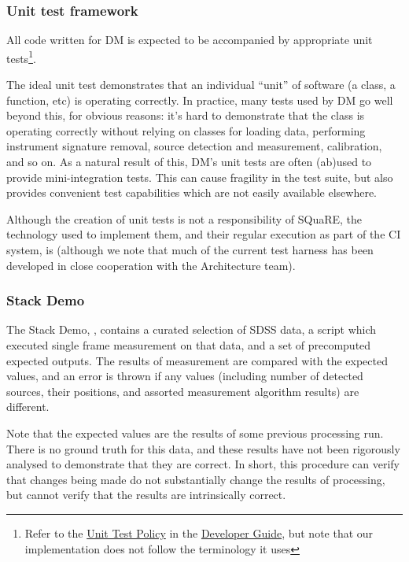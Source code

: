 \documentclass[DM,authoryear,toc,lsstdraft]{lsstdoc}
\begin{document}
\subsubsection{Unit test framework}

All code written for DM is expected to be accompanied by appropriate unit
tests\footnote{Refer to the
\href{https://developer.lsst.io/coding/unit_test_policy.html}{Unit Test
Policy} in the \href{https://developer.lsst.io}{Developer Guide}, but note
that our implementation does not follow the terminology it uses}.

The ideal unit test demonstrates that an individual ``unit'' of software (a
class, a function, etc) is operating correctly. In practice, many tests used
by DM go well beyond this, for obvious reasons: it's hard to demonstrate that
the  class is operating correctly without relying on
classes for loading data, performing instrument signature removal, source
detection and measurement, calibration, and so on. As a natural result of
this, DM's unit tests are often (ab)used to provide mini-integration tests.
This can cause fragility in the test suite, but also provides convenient
test capabilities which are not easily available elsewhere.

Although the creation of unit tests is not a responsibility of SQuaRE, the
technology used to implement them, and their regular execution as part of the
CI system, is (although we note that much of the current test harness has been
developed in close cooperation with the Architecture team).

\subsubsection{Stack Demo}
\label{sec:current:square:demo}

The Stack Demo, , contains a curated
selection of SDSS data, a script which executed single frame measurement on
that data, and a set of precomputed expected outputs. The results of
measurement are compared with the expected values, and an error is thrown if
any values (including number of detected sources, their positions, and
assorted measurement algorithm results) are different.

Note that the expected values are the results of some previous processing run.
There is no ground truth for this data, and these results have not been
rigorously analysed to demonstrate that they are correct. In short, this
procedure can verify that changes being made do not substantially change the
results of processing, but cannot verify that the results are intrinsically
correct.
\end{document}
